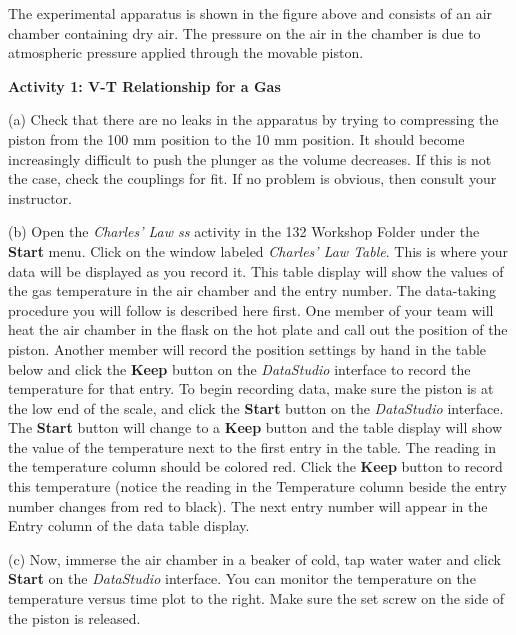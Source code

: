 The experimental apparatus is shown in the figure above and consists
of an air chamber containing dry air. The pressure on the air in the chamber is due to atmospheric
pressure applied through the movable piston.

\textbf{Activity 1: V-T Relationship for a Gas}

(a) Check that there are no leaks in the apparatus by trying to compressing
the piston from the 100 mm position to the 10 mm position. It should become
increasingly difficult to push the plunger as the volume decreases. If this
is not the case, check the couplings for fit. If no problem is obvious, then
consult your instructor. 

(b) Open the {\it Charles' Law ss} activity in the 132 Workshop Folder under the
{\bf Start} menu.
Click on the window labeled \textit{Charles' Law Table}. 
This is where your data will be displayed as you record
it. This table display will show the values of the gas temperature in the air chamber
and the entry number.
The data-taking procedure you will follow is described here first.
One member of your team will heat the air chamber in the flask on the hot plate 
and call out the position of the piston.
Another member will record the position settings by hand in the table below
and
click the {\bf Keep} button on the {\it DataStudio} interface to record the 
temperature for that entry.
To begin recording data, make sure the piston is at the low end of the scale, and click
the {\bf Start} button on the {\it DataStudio} interface. 
The {\bf Start} button will change to a {\bf Keep} button and the table
display will show the value of the temperature next to the first entry in the table. 
The reading in the temperature column should be colored red.
Click the {\bf Keep} button to record this temperature (notice the reading in the Temperature
column beside the entry number changes from red to black). The next entry number
 will appear in the Entry column of the data table display.


(c) Now, immerse the air chamber in a beaker of cold, tap water water and click
{\bf Start} on the {\it DataStudio} interface. You can monitor the temperature
on the temperature versus time plot to the right.
Make sure the set screw on the side of the piston is released.

